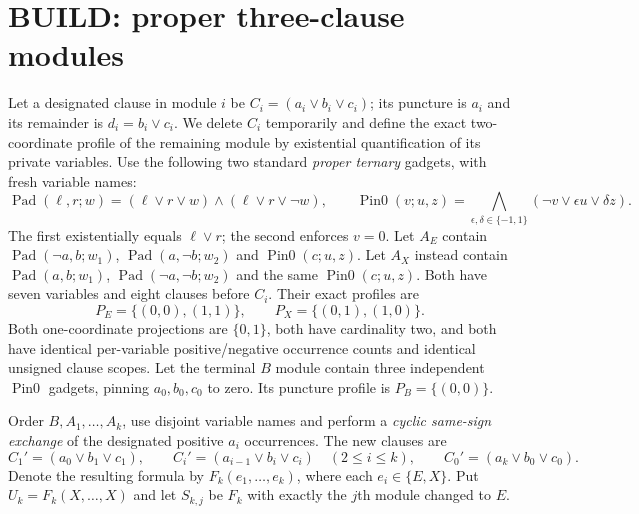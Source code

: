 \documentclass[11pt]{article}
\begin{document}
\section{BUILD: proper three-clause modules}
Let a designated clause in module $i$ be $C_i=(a_i\lor b_i\lor c_i)$; its puncture is $a_i$ and its remainder is $d_i=b_i\lor c_i$. We delete $C_i$ temporarily and define the exact two-coordinate profile of the remaining module by existential quantification of its private variables. Use the following two standard \emph{proper ternary} gadgets, with fresh variable names:
\[
\operatorname{Pad}(\ell,r;w)=(\ell\lor r\lor w)\land(\ell\lor r\lor\neg w),\qquad
\operatorname{Pin0}(v;u,z)=\bigwedge_{\epsilon,\delta\in\{-1,1\}}(\neg v\lor\epsilon u\lor\delta z).
\]
The first existentially equals $\ell\lor r$; the second enforces $v=0$. Let $A_E$ contain $\operatorname{Pad}(\neg a,b;w_1)$, $\operatorname{Pad}(a,\neg b;w_2)$ and $\operatorname{Pin0}(c;u,z)$. Let $A_X$ instead contain $\operatorname{Pad}(a,b;w_1)$, $\operatorname{Pad}(\neg a,\neg b;w_2)$ and the same $\operatorname{Pin0}(c;u,z)$. Both have seven variables and eight clauses before $C_i$. Their exact profiles are
\[
\boxed{P_E=\{(0,0),(1,1)\},\qquad P_X=\{(0,1),(1,0)\}.}\tag{1}
\]
Both one-coordinate projections are $\{0,1\}$, both have cardinality two, and both have identical per-variable positive/negative occurrence counts and identical unsigned clause scopes. Let the terminal $B$ module contain three independent $\operatorname{Pin0}$ gadgets, pinning $a_0,b_0,c_0$ to zero. Its puncture profile is $P_B=\{(0,0)\}$.

Order $B,A_1,\ldots,A_k$, use disjoint variable names and perform a \emph{cyclic same-sign exchange} of the designated positive $a_i$ occurrences. The new clauses are
\[
 C_1'=(a_0\lor b_1\lor c_1),\qquad
 C_i'=(a_{i-1}\lor b_i\lor c_i)\quad(2\le i\le k),\qquad
 C_0'=(a_k\lor b_0\lor c_0).
\]
Denote the resulting formula by $F_k(e_1,\ldots,e_k)$, where each $e_i\in\{E,X\}$. Put $U_k=F_k(X,\ldots,X)$ and let $S_{k,j}$ be $F_k$ with exactly the $j$th module changed to $E$.
\end{document}

